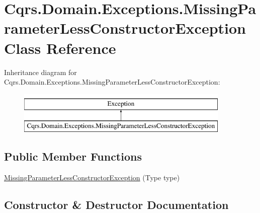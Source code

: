 \hypertarget{classCqrs_1_1Domain_1_1Exceptions_1_1MissingParameterLessConstructorException}{}\section{Cqrs.\+Domain.\+Exceptions.\+Missing\+Parameter\+Less\+Constructor\+Exception Class Reference}
\label{classCqrs_1_1Domain_1_1Exceptions_1_1MissingParameterLessConstructorException}
Inheritance diagram for Cqrs.\+Domain.\+Exceptions.\+Missing\+Parameter\+Less\+Constructor\+Exception\+:\begin{figure}[H]
\begin{center}
\leavevmode
\includegraphics[height=2.000000cm]{classCqrs_1_1Domain_1_1Exceptions_1_1MissingParameterLessConstructorException}
\end{center}
\end{figure}
\subsection*{Public Member Functions}
\begin{DoxyCompactItemize}
\item 
\hyperlink{classCqrs_1_1Domain_1_1Exceptions_1_1MissingParameterLessConstructorException_a5de10c873bab008d2527ff96fdf5f6b2_a5de10c873bab008d2527ff96fdf5f6b2}{Missing\+Parameter\+Less\+Constructor\+Exception} (Type type)
\end{DoxyCompactItemize}


\subsection{Constructor \& Destructor Documentation}
\mbox{\label{classCqrs_1_1Domain_1_1Exceptions_1_1MissingParameterLessConstructorException_a5de10c873bab008d2527ff96fdf5f6b2_a5de10c873bab008d2527ff96fdf5f6b2}} 
